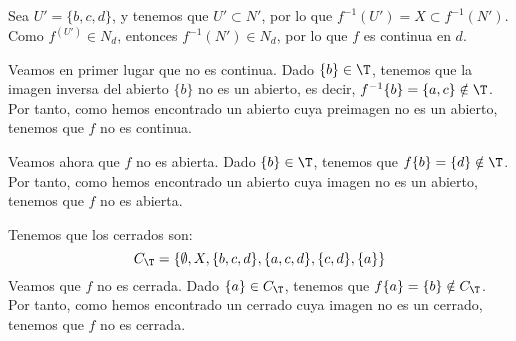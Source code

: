 \begin{ejercicio}
\begin{itemize}
        Sea $U'=\{b,c,d\}$, y tenemos que $U'\subset N'$, por lo que $f^{-1}(U')=X\subset f^{-1}(N')$.
        Como $f^(U')\in N_{d}$, entonces $f^{-1}(N')\in N_{d}$, por lo que $f$ es continua en $d$.
    \end{itemize}
    
    Veamos en primer lugar que no es continua. Dado $\{b\}\in \T$, tenemos que la imagen inversa del abierto $\{b\}$ no es un abierto, es decir, $f^{-1}\{b\}=\{a,c\}\notin \T$. Por tanto, como hemos encontrado un abierto cuya preimagen no es un abierto, tenemos que $f$ no es continua.

    Veamos ahora que $f$ no es abierta. Dado $\{b\}\in \T$, tenemos que $f\{b\}=\{d\}\notin \T$. Por tanto, como hemos encontrado un abierto cuya imagen no es un abierto, tenemos que $f$ no es abierta.

    Tenemos que los cerrados son:
    \begin{equation*}
        C_\T=\{\emptyset, X, \{b,c,d\}, \{a,c,d\}, \{c,d\}, \{a\}\}
    \end{equation*}
    Veamos que $f$ no es cerrada. Dado $\{a\}\in C_\T$, tenemos que $f\{a\}=\{b\}\notin C_\T$. Por tanto, como hemos encontrado un cerrado cuya imagen no es un cerrado, tenemos que $f$ no es cerrada.
\end{ejercicio}


